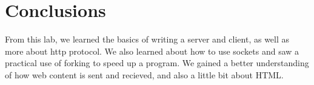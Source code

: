 \documentclass{article}
\begin{document}
\section*{Conclusions}
From this lab, we learned the basics of writing a server and client, as well as more about http protocol. We also learned about how to use sockets and saw a practical use of forking to speed up a program. We gained a better understanding of how web content is sent and recieved, and also a little bit about HTML.
\end{document}
